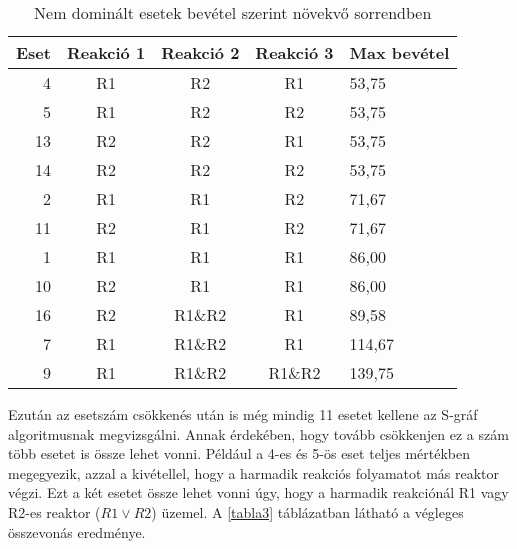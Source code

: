 	

\begin{table}[H]
	\begin{center}
		\caption{Nem dominált esetek bevétel szerint növekvő sorrendben}
		\captionsetup[table]{skip=10pt}	
		\label{tabla2}	
		\begin{tabular}{r|ccc|l}
		Eset & Reakció 1 & Reakció 2 & Reakció 3 & Max bevétel  \\ 
		\hline
		4    & R1        & R2        & R1        & 53,75        \\
		5    & R1        & R2        & R2        & 53,75        \\
		13   & R2        & R2        & R1        & 53,75        \\
		14   & R2        & R2        & R2        & 53,75        \\
		2    & R1        & R1        & R2        & 71,67        \\
		11   & R2        & R1        & R2        & 71,67        \\
		1    & R1        & R1        & R1        & 86,00        \\
		10   & R2        & R1        & R1        & 86,00        \\
		16   & R2        & R1\&R2    & R1        & 89,58        \\
		7    & R1        & R1\&R2    & R1        & 114,67       \\
		9    & R1        & R1\&R2    & R1\&R2    & 139,75      
		\end{tabular}
	\end{center}
\end{table}

Ezután az esetszám csökkenés után is még mindig 11 esetet kellene az S-gráf algoritmusnak megvizsgálni.
Annak érdekében, hogy tovább csökkenjen ez a szám több esetet is össze lehet vonni.
Például a 4-es és 5-ös eset teljes mértékben megegyezik, azzal a kivétellel, hogy a harmadik reakciós folyamatot más reaktor végzi.
Ezt a két esetet össze lehet vonni úgy, hogy a harmadik reakciónál R1 vagy R2-es reaktor ($R1 \vee R2$) üzemel.
A \ref{tabla3} táblázatban látható a végleges összevonás eredménye.

